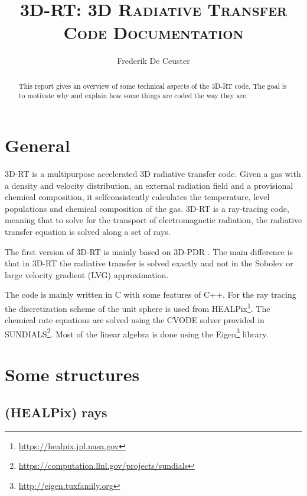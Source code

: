 \documentclass[]{article}
\title{\vspace{0cm} \huge \textsc{3D-RT: 3D Radiative Transfer} \\
                \vskip3mm \textsc{Code Documentation} }
\author{\large Frederik De Ceuster}
\date{}
\begin{document}
\maketitle

\vskip5cm

\begin{abstract}
This report gives an overview of some technical aspects of the 3D-RT code. The goal is to motivate why and explain how some things are coded the way they are.
\end{abstract}

\vskip5cm

\tableofcontents

\newpage


\section{General}

3D-RT is a multipurpose accelerated 3D radiative transfer code. Given a gas with a density and velocity distribution, an external radiation field and a provisional chemical composition, it selfconsistently calculates the temperature, level populations and chemical composition of the gas. 3D-RT is a ray-tracing code, meaning that to solve for the transport of electromagnetic radiation, the radiative transfer equation is solved along a set of rays.

\bigskip

The first version of 3D-RT is mainly based on 3D-PDR \cite{3DPDR}. The main difference is that in 3D-RT the radiative transfer is solved exactly and not in the Sobolev or large velocity gradient (LVG) approximation.

\bigskip

The code is mainly written in C with some features of C++. For the ray tracing the discretization scheme of the unit sphere is used from HEALPix\footnote{\url{https://healpix.jpl.nasa.gov}}. The chemical rate equations are solved using the CVODE solver provided in SUNDIALS\footnote{\url{https://computation.llnl.gov/projects/sundials}}. Most of the linear algebra is done using the Eigen\footnote{\url{http://eigen.tuxfamily.org}} library.



\section{Some structures}

\subsection{(HEALPix) rays}
\end{document}
